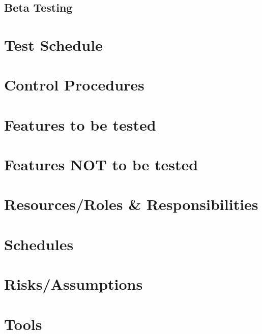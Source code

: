 \documentclass[a4paper, 10pt]{article}
\begin{document}
    \subsection{Beta Testing}

\section{Test Schedule}

\section{Control Procedures}

\section{Features to be tested}

\section{Features NOT to be tested}

\section{Resources/Roles \& Responsibilities}

\section{Schedules}

\section{Risks/Assumptions}

\section{Tools}
\end{document}
